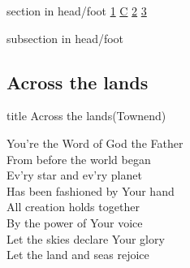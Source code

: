 \documentclass{beamer}
\begin{document}
{
{ 
 {
 \begin{beamercolorbox}[ht=4.5ex,dp=1.5ex,%
      leftskip=.3cm,rightskip=.3cm plus1fil]{section in head/foot}
 \fontsize{12}{25}\selectfont 
\hyperlink{Across the lands["You're the Word of God the Father"](Townend)1}{1}
\hyperlink{Across the lands["You're the Word of God the Father"](Townend)C}{C}
\hyperlink{Across the lands["You're the Word of God the Father"](Townend)2}{2}
\hyperlink{Across the lands["You're the Word of God the Father"](Townend)3}{3}
 
 \end{beamercolorbox}%
  \begin{beamercolorbox}[ht=2.5ex,dp=1.125ex,%
   leftskip=.3cm,rightskip=.3cm plus1fil]{subsection in head/foot}
   \insertauthor
 \end{beamercolorbox}%
 }
}
\subsection{ Across the lands }

\hypertarget{Across the lands["You're the Word of God the Father"](Townend)}{}
\begin{frame}{}
 \vfill
  \centering
  \begin{beamercolorbox}[sep=8pt,center,shadow=true,rounded=true]{title}
    Across the lands(Townend)    
  \end{beamercolorbox}
  \vfill
\end{frame}

\hypertarget{Across the lands["You're the Word of God the Father"](Townend)1}{}
\begin{frame}{}
\fontsize{ 18 }{ 23 }\selectfont

You're the Word of God the Father\\ 
From before the world began\\ 
Ev'ry star and ev'ry planet\\ 
Has been fashioned by Your hand\\ 
All creation holds together\\ 
By the power of Your voice\\ 
Let the skies declare Your glory\\ 
Let the land and seas rejoice 

\end{frame}

\hypertarget{Across the lands["You're the Word of God the Father"](Townend)C}{}
\begin{frame}{}
\fontsize{ 18 }{ 23 }\selectfont


\end{frame}}
\end{document}
